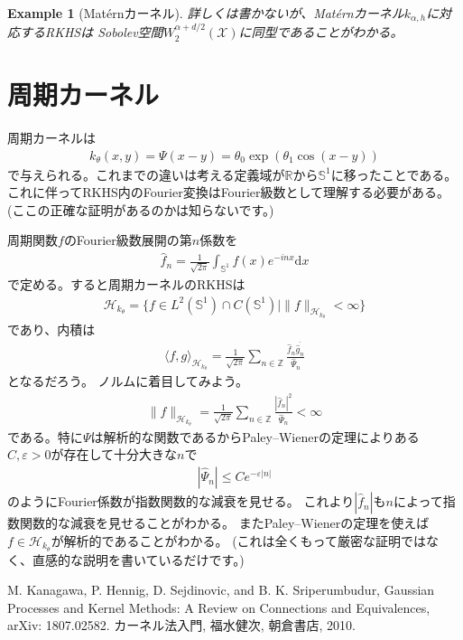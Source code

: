 \documentclass{article}
\newcommand{\diff}{\mathrm{d}}
\newtheorem{eg}{Example}[section]
\begin{document}
\begin{eg}[Mat\'ernカーネル]
詳しくは書かないが、Mat\'ernカーネル$k_{\alpha,h}$に対応するRKHSは
Sobolev空間$W_{2}^{\alpha+d/2}(\mathcal{X})$に同型であることがわかる。
\end{eg}

\section{周期カーネル}
周期カーネルは
\begin{align}
    k_{\theta}(x,y)=\Psi(x-y)=\theta_{0}\exp(\theta_{1}\cos(x-y))
\end{align}
で与えられる。これまでの違いは考える定義域が$\mathbb{R}$から$\mathbb{S}^{1}$に移ったことである。
これに伴ってRKHS内のFourier変換はFourier級数として理解する必要がある。(ここの正確な証明があるのかは知らないです。)

周期関数$f$のFourier級数展開の第$n$係数を
\begin{align}
    \hat{f}_{n}=\frac{1}{\sqrt{2\pi}}\int_{\mathbb{S}^{1}}f(x)e^{-inx}\diff x
\end{align}
で定める。すると周期カーネルのRKHSは
\begin{align}
    \mathcal{H}_{k_{\theta}}=\{f\in L^{2}(\mathbb{S}^{1}) \cap C(\mathbb{S}^{1}) \mid \|f\|_{\mathcal{H}_{k_{\theta}}}<\infty \}
\end{align}
であり、内積は
\begin{align}
    \langle f,g \rangle_{\mathcal{H}_{k_{\theta}}}
    =\frac{1}{\sqrt{2\pi}}\sum_{n\in\mathbb{Z}}\frac{\hat{f}_{n}\overline{\hat{g}_{n}}}{\hat{\Psi}_{n}}
\end{align}
となるだろう。
ノルムに着目してみよう。
\begin{align}
    \|f\|_{\mathcal{H}_{k_{\theta}}}=\frac{1}{\sqrt{2\pi}}\sum_{n\in\mathbb{Z}}\frac{|\hat{f}_{n}|^{2}}{\hat{\Psi}_{n}}<\infty
\end{align}
である。特に$\Psi$は解析的な関数であるからPaley–Wienerの定理によりある$C,\varepsilon>0$が存在して十分大きな$n$で
\begin{align}
|\hat{\Psi}_{n}|\leq Ce^{-\varepsilon|n|}
\end{align}
のようにFourier係数が指数関数的な減衰を見せる。
これより$|\hat{f}_{n}|$も$n$によって指数関数的な減衰を見せることがわかる。
またPaley–Wienerの定理を使えば$f\in\mathcal{H}_{k_{\theta}}$が解析的であることがわかる。
(これは全くもって厳密な証明ではなく、直感的な説明を書いているだけです。)

\begin{thebibliography}{99}
     M. Kanagawa, P. Hennig, D. Sejdinovic, and B. K. Sriperumbudur,
    Gaussian Processes and Kernel Methods: A Review on Connections and Equivalences,
    arXiv: 1807.02582.
     カーネル法入門, 福水健次, 朝倉書店, 2010.
  \end{thebibliography}
\end{document}
